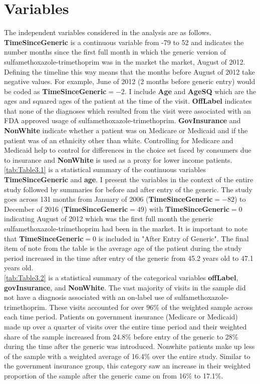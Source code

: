 \section{Variables}
The independent variables considered in the analysis are as follows. \textbf{TimeSinceGeneric} is a continuous variable from -79 to 52 and indicates the number months since the first full month in which the generic version of sulfamethoxazole-trimethoprim was in the market the market, August of 2012. Defining the timeline this way means that the months before August of 2012 take negative values. For example, June of 2012 (2 months before generic entry) would be coded as \textbf{TimeSinceGeneric}$=-2$. I include \textbf{Age} and \textbf{AgeSQ} which are the ages and squared ages of the patient at the time of the visit. \textbf{OffLabel} indicates that none of the diagnoses which resulted from the visit were associated with an FDA approved usage of sulfamethoxazole-trimethoprim. \textbf{GovInsurance} and \textbf{NonWhite} indicate whether a patient was on Medicare or Medicaid and if the patient was of an ethnicity other than white. Controlling for Medicare and Medicaid help to control for differences in the choice set faced by consumers due to insurance and \textbf{NonWhite} is used as a proxy for lower income patients.\\
\indent \autoref{tab:Table3.1} is a statistical summary of the continuous variables \textbf{TimeSinceGeneric} and \textbf{age}. I present the variables in the context of the entire study followed by summaries for before and after entry of the generic. The study goes across 131 months from January of 2006 (\textbf{TimeSinceGeneric}$=-82$) to December of 2016 (\textbf{TimeSinceGeneric}$=49$) with \textbf{TimeSinceGeneric}$=0$ indicating August of 2012 which was the first full month the generic sulfamethoxazole-trimethoprim had been in the market. It is important to note that \textbf{TimeSinceGeneric}$=0$ is included in "After Entry of Generic". The final item of note from the table is the average age of the patient during the study period increased in the time after entry of the generic from 45.2 years old to 47.1 years old.\\

\newpage
\indent \autoref{tab:Table3.2} is a statistical summary of the categorical variables \textbf{offLabel}, \textbf{govInsurance}, and \textbf{NonWhite}. The vast majority of visits in the sample did not have a diagnosis associated with an on-label use of sulfamethoxazole-trimethoprim. These visits accounted for over 96\% of the weighted sample across each time period. Patients on government insurance (Medicare or Medicaid) made up over a quarter of visits over the entire time period and their weighted share of the sample increased from 24.8\% before entry of the generic to 28\% during the time after the generic was introduced. Nonwhite patients make up less of the sample with a weighted average of 16.4\% over the entire study. Similar to the government insurance group, this category saw an increase in their weighted proportion of the sample after the generic came on from 16\% to 17.1\%.
